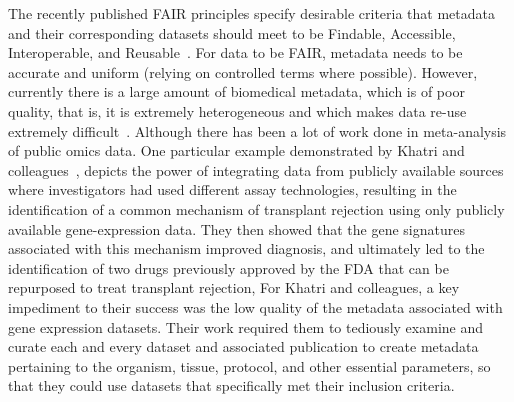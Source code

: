The recently published FAIR principles specify desirable criteria that metadata and their corresponding datasets should meet to be Findable, Accessible, Interoperable, and Reusable~\cite{Wilkinson2016}.
For data to be FAIR, metadata needs to be accurate and uniform (relying on controlled terms where possible). However, currently there is a large amount of biomedical metadata, which is of poor quality, that is, it is extremely heterogeneous and which makes data re-use extremely difficult~\cite{gonccalves2017metadata}. 
Although there has been a lot of work done in meta-analysis of public omics data. One particular example demonstrated by Khatri and colleagues~\cite{khatri2013common}, depicts the power of integrating data from publicly available sources where investigators had used different assay technologies, resulting in the identification of a common mechanism of transplant rejection using only publicly available gene-expression data. 
They then showed that the gene signatures associated with this mechanism improved diagnosis, and ultimately led to the identification of two drugs previously approved by the FDA that can be repurposed to treat transplant rejection,
For Khatri and colleagues, a key impediment to their success was the low quality of the metadata associated with gene expression datasets. Their work required them to tediously examine and curate each and every dataset and associated publication to create metadata pertaining to the organism, tissue, protocol, and other essential parameters, so that they could use datasets that specifically met their inclusion criteria.

